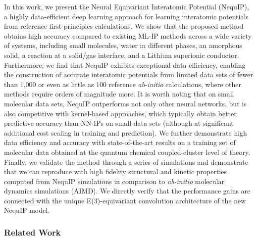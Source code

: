 \documentclass[11pt]{article}
\begin{document}
In this work, we present the Neural Equivariant Interatomic Potential (NequIP), a highly data-efficient deep learning approach for learning interatomic potentials from reference first-principles calculations. We show that the proposed method obtains high accuracy compared to existing ML-IP methods across a wide variety of systems, including small molecules, water in different phases, an amorphous solid, a reaction at a solid/gas interface, and a Lithium superionic conductor. Furthermore, we find that NequIP exhibits exceptional data efficiency, enabling the construction of accurate interatomic potentials from limited data sets of fewer than 1,000 or even as little as 100 reference \textit{ab-initio} calculations, where other methods require orders of magnitude more. It is worth noting that on small molecular data sets, NequIP outperforms not only other neural networks, but is also competitive with kernel-based approaches, which typically obtain better predictive accuracy than NN-IPs on small data sets (although at significant additional cost scaling in training and prediction). We further demonstrate high data efficiency and accuracy with state-of-the-art results on a training set of molecular data obtained at the quantum chemical coupled-cluster level of theory. Finally, we validate the method through a series of simulations and demonstrate that we can reproduce with high fidelity structural and kinetic properties computed from NequIP simulations in comparison to \textit{ab-initio} molecular dynamics simulations (AIMD). We directly verify that the performance gains are connected with the unique E(3)-equivariant convolution architecture of the new NequIP model.\\

\subsubsection{Related Work}
\end{document}
